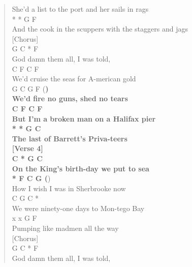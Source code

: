 \documentclass[11pt]{article}
\begin{document}
\begin{verse}
She'd a list to the port and her sails in rags\\
\hspace*{8em}*           *                 G            F\\
And the cook in the scuppers with the staggers and jags\\
\vspace*{1em}
[Chorus]\\
\hspace*{4em}G         C    *     F\\
God damn them all, I was told,\\
\hspace*{5em}C          F          C       F\\
We'd cruise the seas for A-merican gold\\
\hspace*{5em}G       C     G       F     (\textbf{)\\
We'd fire no guns, shed no tears\\
\hspace*{10em}C      F        C       F\\
But I'm a broken man on a Halifax pier\\
\hspace*{4em}*       *         G     C\\
The last of Barrett's Priva-teers\\
\vspace*{1em}
[Verse 4]\\
\hspace*{7em}C            *      G      C\\
On the King's birth-day we put to sea\\
\hspace*{6em}*      F      C          G    (})\\
How I wish I was in Sherbrooke now\\
\hspace*{8em}C          G           C    *\\
We were ninety-one days to Mon-tego Bay\\
x            x      G       F\\
Pumping like madmen all the way\\
\vspace*{1em}
[Chorus]\\
\hspace*{4em}G         C    *     F\\
God damn them all, I was told,\\

\end{verse}
\end{document}
